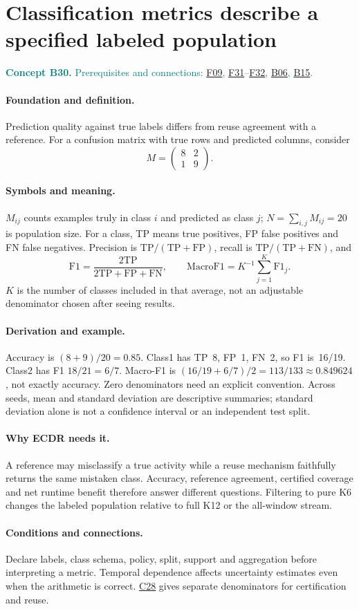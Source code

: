\documentclass[11pt,a4paper]{article}
\newcommand{\conceptid}{Front matter}
\newcommand{\concept}[3]{\clearpage\renewcommand{\conceptid}{#1}%
\section{#2}\label{concept:#1}%
\textcolor{teal}{\textbf{Concept #1.} Prerequisites and connections: #3.}\par
\typeout{ECDR-CONCEPT-START #1 PAGE=\thepage}}
\begin{document}
\concept{B30}{Classification metrics describe a specified labeled population}{\hyperref[concept:F09]{F09}, \hyperref[concept:F31]{F31}--\hyperref[concept:F32]{F32}, \hyperref[concept:B06]{B06}, \hyperref[concept:B15]{B15}}
\paragraph{Foundation and definition.}
Prediction quality against true labels differs from reuse agreement with
a reference. For a confusion matrix with true rows and predicted columns,
consider
\[
 M=\begin{pmatrix}8&2\\1&9\end{pmatrix}.
\]
\paragraph{Symbols and meaning.}
$M_{ij}$ counts examples truly in class $i$ and predicted as class $j$;
$N=\sum_{i,j}M_{ij}=20$ is population size. For a class, TP means true
positives, FP false positives and FN false negatives. Precision is
$\mathrm{TP}/(\mathrm{TP}+\mathrm{FP})$, recall is
$\mathrm{TP}/(\mathrm{TP}+\mathrm{FN})$, and
\[
 \mathrm{F1}=\frac{2\mathrm{TP}}{2\mathrm{TP}+\mathrm{FP}+\mathrm{FN}},
 \qquad \mathrm{MacroF1}=K^{-1}\sum_{j=1}^{K}\mathrm{F1}_j.
\]
$K$ is the number of classes included in that average, not an adjustable
denominator chosen after seeing results.
\paragraph{Derivation and example.}
Accuracy is $(8+9)/20=0.85$. Class1 has TP~8, FP~1, FN~2, so F1 is~16/19.
Class2 has F1 $18/21=6/7$. Macro-F1 is
$(16/19+6/7)/2=113/133\approx0.849624$, not exactly accuracy.
Zero denominators need an explicit convention. Across seeds, mean and
standard deviation are descriptive summaries; standard deviation alone
is not a confidence interval or an independent test split.
\paragraph{Why ECDR needs it.}
A reference may misclassify a true activity while a reuse mechanism
faithfully returns the same mistaken class. Accuracy, reference agreement,
certified coverage and net runtime benefit therefore answer different
questions. Filtering to pure K6 changes the labeled population relative
to full K12 or the all-window stream.
\paragraph{Conditions and connections.}
Declare labels, class schema, policy, split, support and aggregation before
interpreting a metric. Temporal dependence affects uncertainty estimates
even when the arithmetic is correct. \hyperref[concept:C28]{C28} gives separate denominators for
certification and reuse.
\par\label{endconcept:B30}
\end{document}
